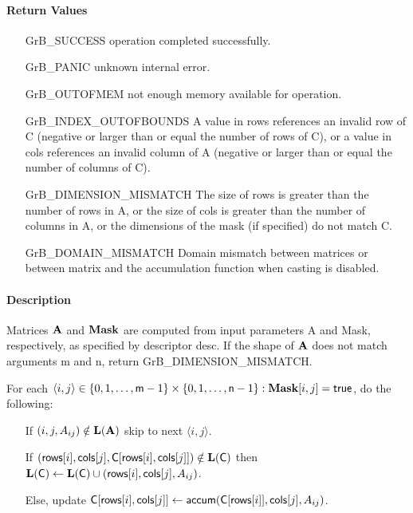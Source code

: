 \paragraph{Return Values}

\begin{itemize}[leftmargin=2.1in]
\item[{\sf GrB\_SUCCESS}]      operation completed successfully.
\item[{\sf GrB\_PANIC}]        unknown internal error.
\item[{\sf GrB\_OUTOFMEM}]     not enough memory available for operation.
\item[{\sf GrB\_INDEX\_OUTOFBOUNDS}]
        A value in {\sf rows} references an invalid row of {\sf C} (negative or larger than or equal the number of rows of {\sf C}),
        or a value in {\sf cols} references an invalid column of {\sf A} (negative or larger than or equal the number of columns of {\sf C}).
\item[{\sf GrB\_DIMENSION\_MISMATCH}] 
        The size of {\sf rows} is greater than the number of rows in {\sf A}, or
        the size of {\sf cols} is greater than the number of columns in {\sf A}, or
        the dimensions of the mask (if specified) do not match {\sf C}.
\item[\sf GrB\_DOMAIN\_MISMATCH]  
       Domain mismatch between matrices or between matrix and the accumulation function when casting is disabled.
\end{itemize}

\paragraph{Description}

Matrices ${\bf A}$ and ${\bf Mask}$ are computed from input parameters {\sf A} and {\sf Mask}, respectively,
as specified by descriptor {\sf desc}. If the shape of ${\bf A}$ does not match arguments {\sf m} and {\sf n},
return {\sf GrB\_DIMENSION\_MISMATCH}.

For each $\langle i,j \rangle \in \{0, 1, \ldots, {\sf m}-1 \} \times \{0, 1, \ldots, {\sf n}-1 \} : {\bf Mask}[i,j] = {\sf true}$, do the following:
\begin{itemize}
	\item[] If $(i,j,A_{ij}) \notin \bold{L}({\bf A})$ skip to next $\langle i,j \rangle$.
	\item[] If $({\sf rows}[i], {\sf cols}[j], {\sf C}[{\sf rows}[i],{\sf cols}[j]]) \notin \bold{L}({\sf C})$ then
	      $\bold{L}({\sf C}) \leftarrow \bold{L}({\sf C}) \cup ({\sf rows}[i],{\sf cols}[j],A_{ij})$.
	\item[]  Else, update ${\sf C}[{\sf rows}[i],{\sf cols}[j]] \leftarrow {\sf accum}({\sf C}[{\sf rows}[i]],{\sf cols}[j],A_{ij})$.
\end{itemize}

